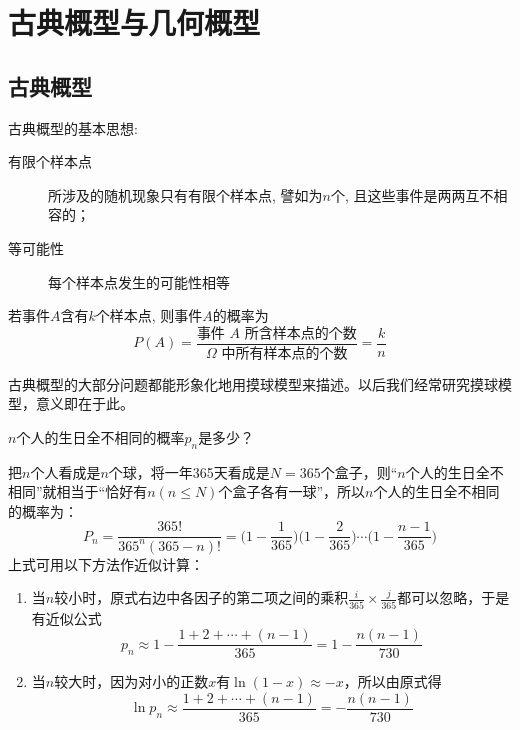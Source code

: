 \section{古典概型与几何概型}

\subsection{古典概型}

古典概型的基本思想:
\begin{description}
    \item[有限个样本点] 所涉及的随机现象只有有限个样本点, 譬如为$n$个, 且这些事件是两两互不相容的；
    \item[等可能性] 每个样本点发生的可能性相等
\end{description}

\begin{definition}[古典概型]
    若事件$A$含有$k$个样本点, 则事件$A$的概率为
    \[  P(A) = \frac{\text{事件 } A \text{ 所含样本点的个数}}{\Omega \text{ 中所有样本点的个数}} = \frac{k}{n} \]
\end{definition}

\begin{note}
    古典概型的大部分问题都能形象化地用摸球模型来描述。以后我们经常研究摸球模型，意义即在于此。
\end{note}

\begin{example}[生日问题]
    $n$个人的生日全不相同的概率$p_n$是多少？
\end{example}
\begin{solution}
    把$n$个人看成是$n$个球，将一年365天看成是$N=365$个盒子，则“$n$个人的生日全不相同”就相当于“恰好有$n (n \le N)$个盒子各有一球”，所以$n$个人的生日全不相同的概率为：
    \[ P_n = \frac{365!}{365^n (365 - n)!} = \biggl(1 - \frac1{365}\biggr) \biggl(1 - \frac{2}{365}\biggr) \dotsb \biggl(1 - \frac{n - 1}{365}\biggr) \]
    上式可用以下方法作近似计算：
    \begin{enumerate}
        \item 当$n$较小时，原式右边中各因子的第二项之间的乘积$\frac{i}{365} \times \frac{j}{365}$都可以忽略，于是有近似公式
              \[ p_n \approx 1 - \frac{1 + 2 + \dotsb + (n - 1)}{365}  = 1 - \frac{n (n - 1)}{730}\]
        \item 当$n$较大时，因为对小的正数$x$有$\ln (1-x) \approx -x$，所以由原式得
              \[ \ln p_n \approx \frac{1 + 2 + \dotsb + (n - 1)}{365} = -\frac{n (n - 1)}{730}\]
    \end{enumerate}
\end{solution}

